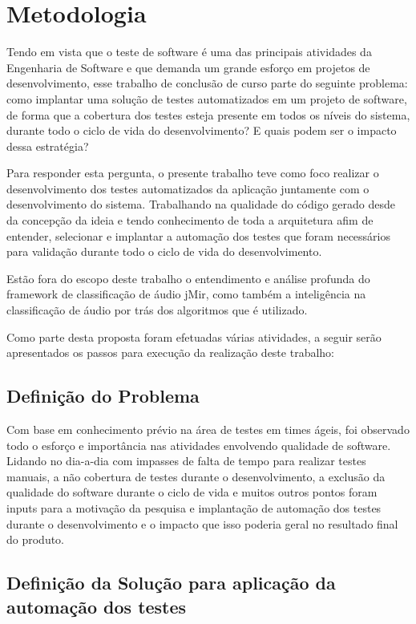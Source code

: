 \chapter{Metodologia}

Tendo em vista que o teste de software é uma das principais atividades da Engenharia 
de Software e que demanda um grande esforço em projetos de desenvolvimento, esse 
trabalho de conclusão de curso parte do seguinte problema: como implantar uma 
solução de testes automatizados em um projeto de software, de forma que a 
cobertura dos testes esteja presente em todos os níveis do sistema, durante todo o 
ciclo de vida do desenvolvimento? E quais podem ser o impacto dessa estratégia?

Para responder esta pergunta, o presente trabalho teve como foco realizar o  desenvolvimento dos testes automatizados da aplicação juntamente com o desenvolvimento do sistema.  Trabalhando na qualidade do código gerado desde da concepção da ideia e tendo conhecimento de toda a arquitetura afim de entender, selecionar e implantar a automação dos testes que foram necessários para validação durante todo o ciclo de vida do desenvolvimento.

Estão fora do escopo deste trabalho o entendimento e análise profunda do framework de classificação de áudio jMir, como também a inteligência na classificação de áudio por trás dos algoritmos que é utilizado.

Como parte desta proposta foram efetuadas várias atividades, a seguir serão apresentados os passos para execução da realização deste trabalho:

\section{Definição do Problema}

Com base em conhecimento prévio na área de testes em times ágeis,  foi observado todo o esforço e importância nas atividades envolvendo qualidade de software.  Lidando no dia-a-dia com impasses de falta de tempo para realizar testes manuais, a não cobertura de testes durante o desenvolvimento, a exclusão da qualidade do software durante o ciclo de vida e muitos outros pontos foram inputs para a motivação da pesquisa e implantação de automação dos testes durante o desenvolvimento e o impacto que isso poderia geral no resultado final do produto.

\section{Definição da Solução para aplicação da automação dos testes}

